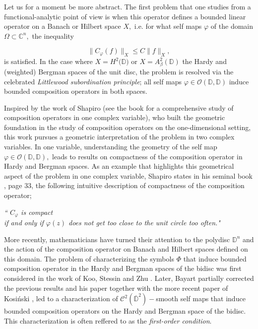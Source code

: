 \documentclass[12pt]{amsart}
\numberwithin{equation}{section}
\begin{document}
Let us for a moment be more abstract. The first problem that one studies from a functional-analytic point of view is when this operator defines a bounded linear operator on a Banach or Hilbert space $X,$ i.e. for what self maps $\varphi$ of the domain $\Omega\subset\mathbb{C}^n,$ the inequality

$$\|C_{\varphi}(f)\|_{X}\leq C\|f\|_{X},$$
is satisfied.
In the case where $X=H^2(\mathbb{D)}$ or $X=A^2_{\beta}(\mathbb{D})$ the Hardy and (weighted) Bergman spaces of the unit disc, the problem is resolved via the celebrated \textit{Littlewood subordination principle}; all self maps $\varphi\in\mathcal{O}(\mathbb{D},\mathbb{D})$ induce bounded composition operators in both spaces.

 Inspired by the work of Shapiro (see the book \cite{Shapiro} for a comprehensive study of composition operators in one complex variable), who built the geometric foundation in the study of composition operators on the one-dimensional setting, this work pursues a geometric interpretation of the problem in two complex variables. In one variable, understanding the geometry of the self map $\varphi\in\mathcal{O}(\mathbb{D},\mathbb{D}),$ leads to results on compactness of the composition operator in Hardy and Bergman spaces. As an example that highlights this geometrical aspect of the problem in one complex variable, Shapiro states in his seminal book \cite{Shapiro}, page 33, the following intuitive description of compactness of the composition operator;

\begin{center} \textit{`` $C_{\varphi}$ is compact \\if and only if $\varphi(z)$ does not get too close to the unit circle too often."}
\end{center}

More recently, mathematicians have turned their attention to the polydisc $\mathbb{D}^n$ and the action of the composition operator on Banach and Hilbert spaces defined on this domain. The problem of characterizing the symbols $\Phi$ that induce bounded composition operator in the Hardy and Bergman spaces of the bidisc was first considered in the work of Koo, Stessin and Zhu \cite{Koo}. Later, Bayart partially corrected the previous results and his paper \cite{Bayart1} together with the more recent paper of Kosi\'nski  \cite{CompositionsKosinski}, led to a characterization of $\mathcal{C}^2(\overline{\mathbb{D}}^2)-$smooth self maps that induce bounded composition operators on the Hardy and Bergman space of the bidisc. This characterization is often reffered to as the \textit{first-order condition}.
\end{document}
